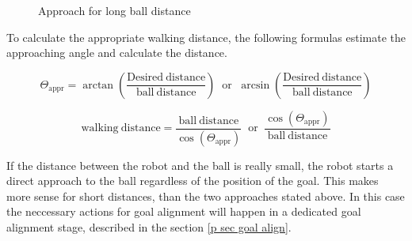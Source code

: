 \begin{figure}[ht]
  \centering
  \caption{Approach for long ball distance}
  \label{j figure bdist hypo}
\end{figure}

To calculate the appropriate walking distance, the following formulas estimate
the approaching angle and calculate the distance.

\begin{equation}
\Theta_\mathrm{appr}=\arctan\left(\frac{\mathrm{Desired\ distance}}{\mathrm{ball\ distance}} \right) \; \; \mathrm{or} \; \; \arcsin\left(\frac{\mathrm{Desired\ distance}}{\mathrm{ball\ distance}}\right)
\end{equation}

\begin{equation}
  \mathrm{walking\ distance}=\frac{\mathrm{ball\ distance}}{\cos(\Theta_\mathrm{appr})} \; \; \mathrm{or} \; \; \frac{\cos(\Theta_\mathrm{appr})}{\mathrm{ball\ distance}}
\end{equation}

If the distance between the robot and the ball is really small, the robot
starts a direct approach to the ball regardless of the position of the goal.
This makes more sense for short distances, than the two approaches stated
above. In this case the neccessary actions for goal alignment will happen in a
dedicated goal alignment stage, described in the section \ref{p sec goal
  align}.
